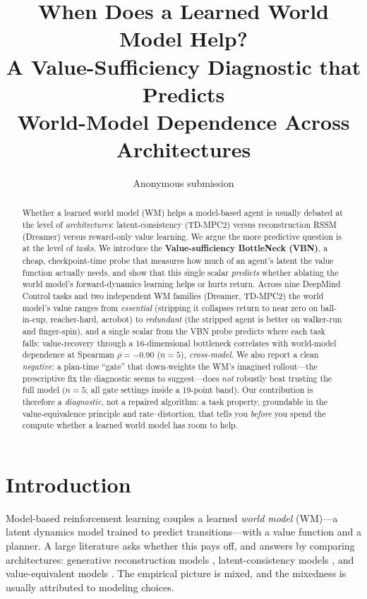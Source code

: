 \documentclass[twocolumn,10pt]{article}
\title{\bf When Does a Learned World Model Help?\\
A Value-Sufficiency Diagnostic that Predicts\\ World-Model Dependence Across Architectures}
\author{Anonymous submission}
\date{}
\begin{document}
\maketitle

\begin{abstract}
Whether a learned world model (WM) helps a model-based agent is usually
debated at the level of \emph{architectures}: latent-consistency (TD-MPC2)
versus reconstruction RSSM (Dreamer) versus reward-only value learning.
We argue the more predictive question is at the level of \emph{tasks}.
We introduce the \textbf{Value-sufficiency BottleNeck (VBN)}, a cheap,
checkpoint-time probe that measures how much of an agent's latent the value
function actually needs, and show that this single scalar \emph{predicts}
whether ablating the world model's forward-dynamics learning helps or hurts
return. Across nine DeepMind Control tasks and two independent WM families
(Dreamer, TD-MPC2) the world model's value ranges from \emph{essential}
(stripping it collapses return to near zero on ball-in-cup,
reacher-hard, acrobot) to \emph{redundant} (the stripped agent is better on
walker-run and finger-spin), and a single scalar from the VBN probe predicts
where each task falls: value-recovery through a 16-dimensional bottleneck
correlates with world-model dependence at Spearman $\rho{=}{-}0.90$
($n{=}5$), \emph{cross-model}. We also report a clean \emph{negative}:
a plan-time ``gate'' that down-weights the WM's imagined rollout---the
prescriptive fix the diagnostic seems to suggest---does \emph{not} robustly
beat trusting the full model ($n{=}5$; all gate settings inside a 19-point
band). Our contribution is therefore a \emph{diagnostic}, not a repaired
algorithm: a task property, groundable in the value-equivalence principle
and rate--distortion, that tells you \emph{before} you spend the compute
whether a learned world model has room to help.
\end{abstract}

\section{Introduction}
Model-based reinforcement learning couples a learned \emph{world model}
(WM)---a latent dynamics model trained to predict transitions---with a value
function and a planner. A large literature asks whether this pays off, and
answers by comparing architectures: generative reconstruction models
\cite{hafner2023dreamerv3}, latent-consistency models
\cite{hansen2024tdmpc2}, and value-equivalent models
\cite{schrittwieser2020muzero,grimm2020value}. The empirical picture is
mixed, and the mixedness is usually attributed to modeling choices.
\end{document}

